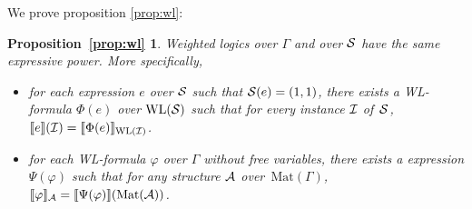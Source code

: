 
\newtheorem*{WL}{Proposition~\ref{prop:wl}}

We prove proposition \ref{prop:wl}:

\begin{WL}
  Weighted logics over $\Gamma$ and \langprod over $\mathcal{S}$ have the same expressive power. More specifically,
  \begin{itemize}
  	\item for each \langprod expression $e$ over $\mathcal{S}$ such that $\mathcal{S}(e)=(1,1)$, there exists a WL-formula $\Phi(e)$ over $\text{WL}(\mathcal{S})$ such that for every instance $\mathcal{I}$ of~$\mathcal{S}$, 
  	$
  	\llbracket e \rrbracket(\mathcal{I}) = \llbracket \Phi(e) \rrbracket_{\text{WL}(\mathcal{I})}
  	$.
  	\item for each WL-formula $\varphi$ over $\Gamma$ without free variables, there exists a \langprod expression $\Psi(\varphi)$ such that for any structure $\mathcal{A}$ over~$\text{Mat}(\Gamma)$,
  	$
  	\llbracket \varphi \rrbracket_{\mathcal{A}}=\llbracket \Psi(\varphi) \rrbracket(\text{Mat}(\mathcal{A}))
  	$.
  \end{itemize}	
\end{WL}

